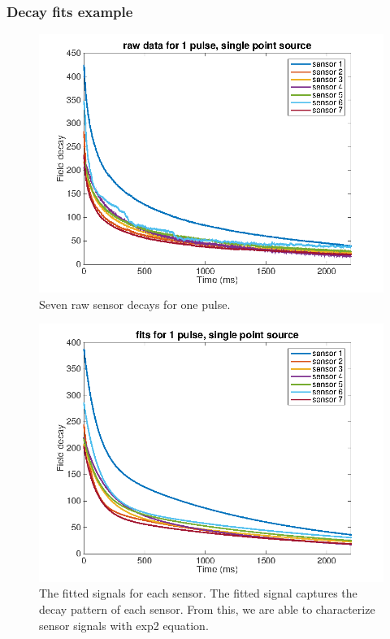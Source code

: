 \documentclass[a4paper]{article}
\begin{document}
\subsubsection*{Decay fits example}

\begin{figure}[H]
\centering
\includegraphics[width=1\textwidth]{raw_data}
\caption{Seven raw sensor decays for one pulse.}
\label{Figure 2}
\end{figure}

\begin{figure}[H]
\centering
\includegraphics[width=1\textwidth]{fitted_data}
\caption{The fitted signals for each sensor. The fitted signal captures the decay pattern of each sensor. From this, we are able to characterize sensor signals with exp2 equation.}
\label{Figure 3}
\end{figure}
\end{document}
